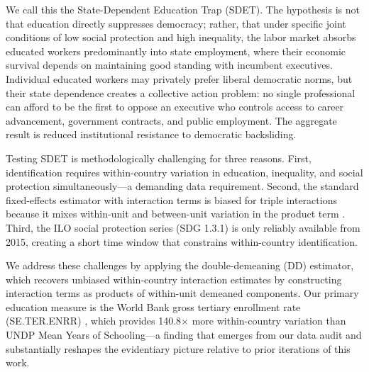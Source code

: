 \documentclass[11pt,letterpaper]{article}
\begin{document}
We call this the State-Dependent Education Trap (SDET). The hypothesis is not that education
directly suppresses democracy; rather, that under specific joint conditions of low social
protection and high inequality, the labor market absorbs educated workers predominantly into state
employment, where their economic survival depends on maintaining good standing with incumbent
executives. Individual educated workers may privately prefer liberal democratic norms, but their
state dependence creates a collective action problem: no single professional can afford to be the
first to oppose an executive who controls access to career advancement, government contracts, and
public employment. The aggregate result is reduced institutional resistance to democratic
backsliding.

Testing SDET is methodologically challenging for three reasons. First, identification requires
within-country variation in education, inequality, and social protection simultaneously---a
demanding data requirement. Second, the standard fixed-effects estimator with interaction terms is
biased for triple interactions because it mixes within-unit and between-unit variation in the
product term \citep{Giesselmann2022}. Third, the ILO social protection series (SDG 1.3.1) is only
reliably available from 2015, creating a short time window that constrains within-country
identification.

We address these challenges by applying the \citet{Giesselmann2022} double-demeaning (DD)
estimator, which recovers unbiased within-country interaction estimates by constructing interaction
terms as products of within-unit demeaned components. Our primary education measure is the World
Bank gross tertiary enrollment rate (SE.TER.ENRR) \citep{WorldBank2024}, which provides
140.8$\times$ more within-country variation than UNDP Mean Years of Schooling---a finding that
emerges from our data audit and substantially reshapes the evidentiary picture relative to prior
iterations of this work.
\end{document}
